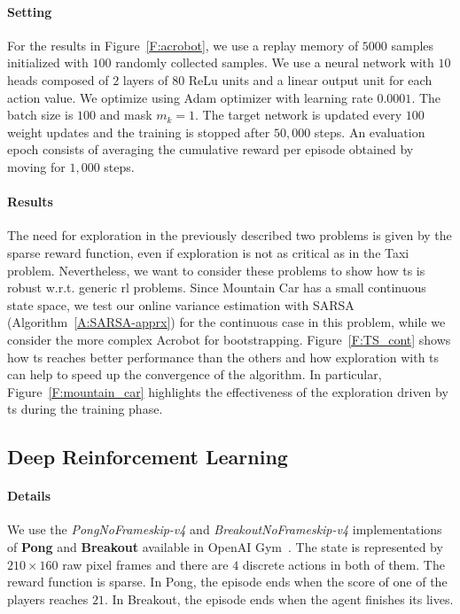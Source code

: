 \paragraph{Setting} For the results in Figure~\ref{F:acrobot}, we use a replay memory of $5000$ samples initialized with $100$ randomly collected samples. We use a neural network with $10$ heads composed of $2$ layers of $80$ ReLu units and a linear output unit for each action value. We optimize using Adam optimizer with learning rate $0.0001$. The batch size is $100$ and mask $m_k = 1$. The target network is updated every $100$ weight updates and the training is stopped after $50,000$ steps. An evaluation epoch consists of averaging the cumulative reward per episode obtained by moving for $1,000$ steps.

\paragraph{Results} The need for exploration in the previously described two problems is given by the sparse reward function, even if exploration is not as critical as in the Taxi problem. Nevertheless, we want to consider these problems to show how \gls{ts} is robust w.r.t. generic \gls{rl} problems. Since Mountain Car has a small continuous state space, we test our online variance estimation with SARSA (Algorithm~\ref{A:SARSA-apprx}) for the continuous case in this problem, while we consider the more complex Acrobot for bootstrapping. Figure~\ref{F:TS_cont} shows how \gls{ts} reaches better performance than the others and how exploration with \gls{ts} can help to speed up the convergence of the algorithm. In particular, Figure~\ref{F:mountain_car} highlights the effectiveness of the exploration driven by \gls{ts} during the training phase.

\subsection{Deep Reinforcement Learning}\label{S:exploration_drl}
\paragraph{Details} We use the \textit{PongNoFrameskip-v4} and \textit{BreakoutNoFrameskip-v4} implementations of \textbf{Pong} and \textbf{Breakout} available in OpenAI Gym~\cite{gym}. The state is represented by $210 \times 160$ raw pixel frames and there are $4$ discrete actions in both of them. The reward function is sparse. In Pong, the episode ends when the score of one of the players reaches $21$. In Breakout, the episode ends when the agent finishes its lives.
